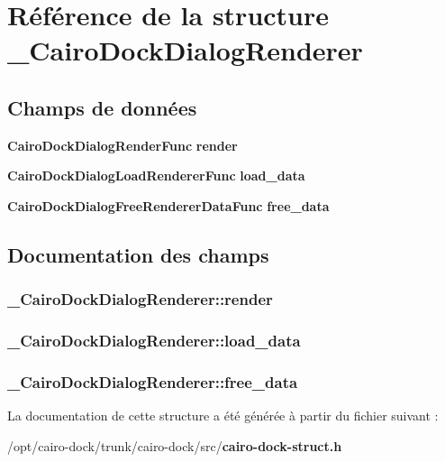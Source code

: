 \section{Référence de la structure \_\-CairoDockDialogRenderer}
\label{struct__CairoDockDialogRenderer}
\subsection*{Champs de données}
\begin{CompactItemize}
\item 
{\bf CairoDockDialogRenderFunc} {\bf render}
\item 
{\bf CairoDockDialogLoadRendererFunc} {\bf load\_\-data}
\item 
{\bf CairoDockDialogFreeRendererDataFunc} {\bf free\_\-data}
\end{CompactItemize}


\subsection{Documentation des champs}
\subsubsection{ {\bf \_\-CairoDockDialogRenderer::render}}\label{struct__CairoDockDialogRenderer_6bf17c551dd16a41cb436e2d53502483}


\subsubsection{ {\bf \_\-CairoDockDialogRenderer::load\_\-data}}\label{struct__CairoDockDialogRenderer_342dd5c4781bedfa00997bface3bb226}


\subsubsection{ {\bf \_\-CairoDockDialogRenderer::free\_\-data}}\label{struct__CairoDockDialogRenderer_83ede47abe198ee89b1806b08700ab5b}




La documentation de cette structure a été générée à partir du fichier suivant :\begin{CompactItemize}
\item 
/opt/cairo-dock/trunk/cairo-dock/src/{\bf cairo-dock-struct.h}\end{CompactItemize}
